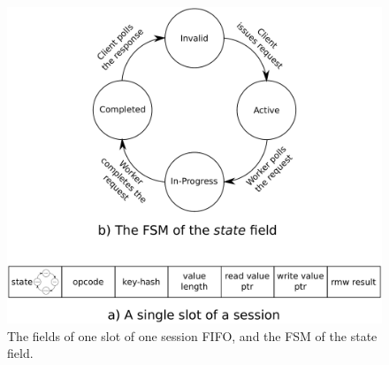 \begin{figure}[t]
   \centering
  \includegraphics[scale=0.25]{1_figures/state-FSM.pdf}
  \caption{The fields of one slot of one session FIFO, and the FSM of the state field.}
  \label{fig:fsm}
\end{figure}